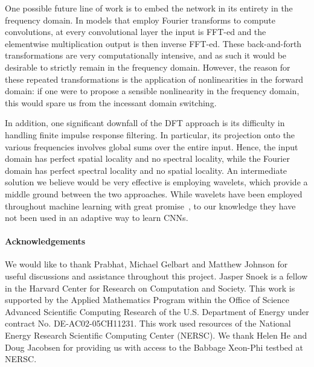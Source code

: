 \documentclass{article} %
\begin{document}
One possible future line of work is to embed the network in its entirety in the frequency domain. In models that employ Fourier transforms to compute convolutions, at every convolutional layer the input is FFT-ed and the elementwise multiplication output is then inverse FFT-ed. These back-and-forth transformations are very computationally intensive, and as such it would be desirable to strictly remain in the frequency domain. However, the reason for these repeated transformations is the application of nonlinearities in the forward domain: if one were to propose a sensible nonlinearity in the frequency domain, this would spare us from the incessant domain switching.

In addition, one significant downfall of the DFT approach is its difficulty in handling finite impulse response filtering. In particular, its projection onto the various frequencies involves global sums over the entire input. Hence, the input domain has perfect spatial locality and no spectral locality, while the Fourier domain has perfect spectral locality and no spatial locality. An intermediate solution we believe would be very effective is employing wavelets, which provide a middle ground between the two approaches. While wavelets have been employed throughout machine learning with great promise~\citep{bruna-2013,oyallon-2013}, to our knowledge they have not been used in an adaptive way to learn CNNs.


\paragraph{Acknowledgements} We would like to thank Prabhat, Michael Gelbart and Matthew Johnson for useful discussions and assistance throughout this project. Jasper Snoek is a fellow in the Harvard Center for Research on Computation and Society. This work is supported by the Applied Mathematics Program within the Office of Science Advanced Scientific Computing Research of the U.S. Department of Energy under contract No. DE-AC02-05CH11231. This work used resources of the National Energy Research Scientific Computing Center (NERSC). We thank Helen He and Doug Jacobsen for providing us with access to the Babbage Xeon-Phi testbed at NERSC.

\small


\end{document}
